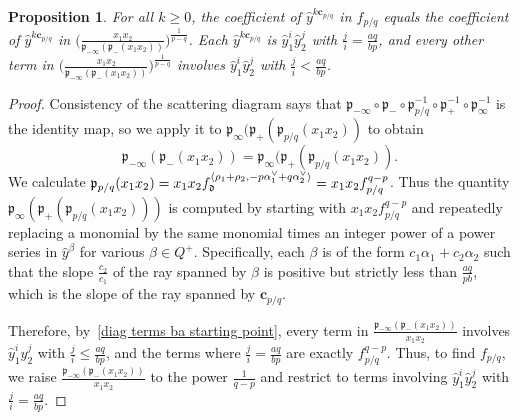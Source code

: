 \documentclass[10pt,a4paper]{amsart}
\newtheorem{prop}[theorem]{Proposition}
\theoremstyle{definition}
\newcommand{\br}[1]{{\langle #1 \rangle}}
\newcommand{\p}{{\mathfrak p}}
\newcommand{\ck}{\spcheck}
\newcommand{\cc}{\mathbf{c}}
\renewcommand{\d}{{\mathfrak d}}
\newcommand{\hy}{\hat{y}}
\begin{document}
\begin{prop}\label{diagonal terms ba}
For all $k\ge0$, the coefficient of $\hy^{k\cc_{p/q}}$ in $f_{p/q}$ equals the coefficient of $\hy^{k\cc_{p/q}}$ in $\bigl(\frac{x_1x_2}{\p_{-\infty}(\p_-(x_1x_2))}\bigr)^{\frac1{p-q}}$.
Each $\hy^{k\cc_{p/q}}$ is $\hy_1^i\hy_2^j$ with $\frac ji=\frac{aq}{bp}$, and every other term in $\bigl(\frac{x_1x_2}{\p_{-\infty}(\p_-(x_1x_2))}\bigr)^{\frac1{p-q}}$ involves $\hy_1^i\hy_2^j$ with $\frac ji<\frac{aq}{bp}$.
\end{prop}


\begin{proof}
Consistency of the scattering diagram says that ${\p_{-\infty}\circ\p_-\circ\p_{p/q}^{-1}\circ\p_+^{-1}\circ\p_\infty^{-1}}$ is the identity map, so we apply it to $\p_\infty(\p_+(\p_{p/q}(x_1x_2))$ to obtain
\begin{equation}\label{diag terms ba starting point}
\p_{-\infty}(\p_-(x_1x_2))=\p_\infty(\p_+(\p_{p/q}(x_1x_2)).
\end{equation}
We calculate $\p_{p/q}(x_1x_2)=x_1x_2 f_\d^{\br{\rho_1+\rho_2,-p\alpha_1\ck+q\alpha_2\ck}}=x_1x_2f_{p/q}^{q-p}$.
Thus the quantity $\p_\infty(\p_+(\p_{p/q}(x_1x_2)))$ is computed by starting with $x_1x_2f_{p/q}^{q-p}$ and repeatedly replacing a monomial by the same monomial times an integer power of a power series in $\hy^\beta$ for various $\beta\in Q^+$.
Specifically, each $\beta$ is of the form $c_1\alpha_1+c_2\alpha_2$ such that the slope $\frac{c_2}{c_1}$ of the ray spanned by $\beta$ is positive but strictly less than $\frac{aq}{pb}$, which is the slope of the ray spanned by $\cc_{p/q}$.

Therefore, by~\eqref{diag terms ba starting point}, every term in $\frac{\p_{-\infty}(\p_-(x_1x_2))}{x_1x_2}$ involves $\hy_1^i\hy_2^j$ with $\frac ji\le\frac{aq}{bp}$, and the terms where $\frac ji=\frac{aq}{bp}$ are exactly $f_{p/q}^{q-p}$.
Thus, to find $f_{p/q}$, we raise $\frac{\p_{-\infty}(\p_-(x_1x_2))}{x_1x_2}$ to the power $\frac1{q-p}$ and restrict to terms involving $\hy_1^i\hy_2^j$ with $\frac ji=\frac{aq}{bp}$.
\end{proof}
\end{document}

